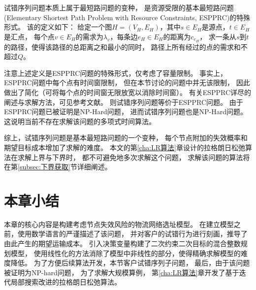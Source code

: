 试错序列问题本质上属于最短路问题的变种，
是资源受限的基本最短路问题
(Elementary Shortest Path Problem with Resource Constraints, ESPPRC)的特殊形式。
该的定义如下：
给定一个图$H=(V_H,E_H)$，其中$s\in E_H$是源点，$t\in E_H$是汇点，
每个点$v\in E_H$的需求为$\lambda_v$，每条边$e_H\in E_H$的距离为$c_{e_H}$，
求一条从$s$到$t$的路径，使得该路径的总距离之和最小的同时，
路径上所有经过的点的需求和不超过$Q$。

注意上述定义是ESPPRC问题的特殊形式，仅考虑了容量限制。
事实上，ESPPRC问题中每个点有时间窗限制，
但在本节讨论的问题中并无该限制，
因此做出了简化（可将每个点的时间窗无限放宽以消除时间窗）。
有关ESPPRC详尽的阐述与求解方法，可见参考文献\cite{pulse}。
则试错序列问题等价于ESPPRC问题。
由于ESPPRC问题已被证明是NP-Hard问题\cite{Dror1994}，
进而试错序列问题也是NP-Hard问题。
这说明当前不存在求解该问题的多项式时间算法。

综上，试错序列问题是基本最短路问题的一个变种，
每个节点附加的失效概率和期望目标成本增加了求解的难度。
本文的第\ref{cha:LR算法}章设计的拉格朗日松弛算法在求解上界与下界时，
都不可避免地多次求解这个问题，
求解该问题的算法将在第\ref{subsec:下界获取}节详细阐述。

\section{本章小结}
\label{sec:小结3}
本章的核心内容是构建考虑节点失效风险的物流网络选址模型。
在建立模型之前，使用数学语言的严谨描述了该问题，
并对客户的试错行为进行刻画，推导了由此产生的期望运输成本。
引入决策变量构建了二次约束二次目标的混合整数规划模型，
使用线性化的方法消除了模型中非线性的部分，使得精确求解模型的难度降低。
为了方便后续算法开发，本节客户试错序列子问题，
最后，由于该问题被证明为NP-hard问题，
为了求解大规模算例，
第\ref{cha:LR算法}章开发了基于迭代局部搜索改进的拉格朗日松弛算法。